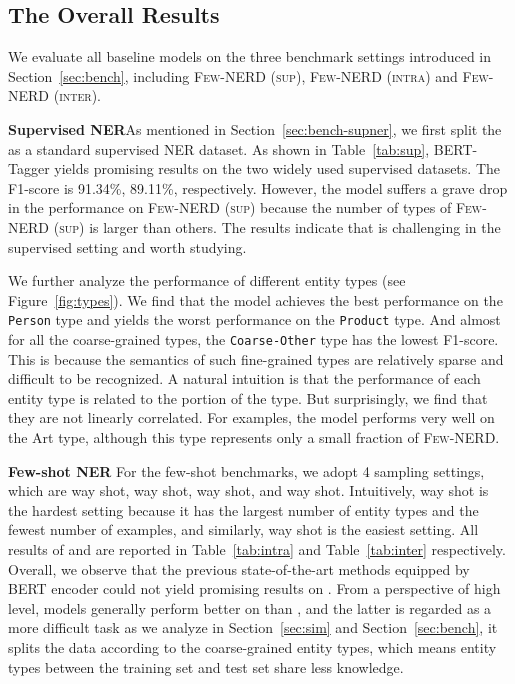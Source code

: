 \documentclass[11pt,a4paper, dvipsnames]{article}
\begin{document}
\subsection{The Overall Results}
We evaluate all baseline models on the three benchmark settings introduced in Section~\ref{sec:bench}, including \textsc{Few-NERD (sup)}, \textsc{Few-NERD (intra)} and \textsc{Few-NERD (inter)}.

\noindent \textbf{Supervised NER}\quad As mentioned in Section~\ref{sec:bench-supner}, we first split the  as a standard supervised NER dataset. As shown in Table~\ref{tab:sup}, BERT-Tagger yields promising results on the two widely used supervised datasets. The F1-score is 91.34\%, 89.11\%, respectively. However, the model suffers a grave drop in the performance on \textsc{Few-NERD (sup)} because the number of types of \textsc{Few-NERD (sup)} is larger than others. The results indicate that  is challenging in the supervised setting and worth studying.

We further analyze the performance of different entity types (see Figure~\ref{fig:types}). We find that the model achieves the best performance on the \texttt{Person} type and yields the worst performance on the \texttt{Product} type. And almost for all the coarse-grained types, the \texttt{Coarse-Other} type has the lowest F1-score. This is because the semantics of such fine-grained types are relatively sparse and difficult to be recognized. A natural intuition is that the performance of each entity type is related to the portion of the type. But surprisingly, we find that they are not linearly correlated. For examples, the model performs very well on the Art type, although this type represents only a small fraction of \textsc{Few-NERD}.

 

\noindent \textbf{Few-shot NER} \quad For the few-shot benchmarks, we adopt 4 sampling settings, which are  way  shot,  way  shot,  way  shot, and  way  shot. Intuitively,  way  shot is the hardest setting because it has the largest number of entity types and the fewest number of examples, and similarly,  way  shot is the easiest setting.
All results of  and  are reported in Table~\ref{tab:intra} and Table~\ref{tab:inter} respectively. Overall, we observe that the previous state-of-the-art methods equipped by BERT encoder could not yield promising results on . From a perspective of high level, models generally perform better on  than , and the latter is regarded as a more difficult task as we analyze in Section~\ref{sec:sim} and Section~\ref{sec:bench}, it splits the data according to the coarse-grained entity types, which means entity types between the training set and test set share less knowledge.  
\end{document}
